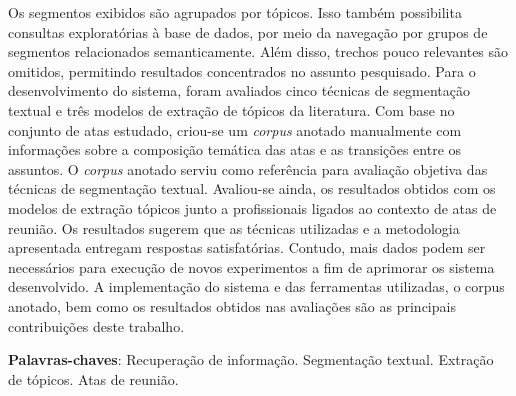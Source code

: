 \begin{resumo}
Os segmentos exibidos são agrupados por tópicos. Isso também possibilita consultas exploratórias à base de dados, por meio da navegação por grupos de segmentos relacionados semanticamente. Além disso, trechos pouco relevantes são omitidos, permitindo resultados concentrados no assunto pesquisado.
% 
% 
% 
% 
Para o desenvolvimento do sistema, 
foram avaliados cinco técnicas de segmentação textual e três modelos de extração de tópicos da literatura. Com base no conjunto de atas estudado, criou-se um \textit{corpus} anotado manualmente com informações sobre a composição temática das atas e as transições entre os assuntos. O \textit{corpus} anotado serviu como referência para avaliação objetiva das técnicas de segmentação textual. Avaliou-se ainda, os resultados obtidos com os modelos de extração tópicos junto a profissionais ligados ao contexto de atas de reunião.
% 
% 
% 
% 
Os resultados sugerem que as técnicas utilizadas e a metodologia apresentada entregam respostas satisfatórias. Contudo, mais dados podem ser necessários para execução de novos experimentos a fim de aprimorar os sistema desenvolvido.
% 
% 
% 
% 
% 
A implementação do sistema e das ferramentas utilizadas, o corpus anotado, bem como os resultados obtidos nas avaliações são as principais contribuições deste trabalho. 
% 
% 
% 
% 
% 


\textbf{Palavras-chaves}: 
Recuperação de informação. 
Segmentação textual. 
Extração de tópicos.
Atas de reunião.

\end{resumo}


